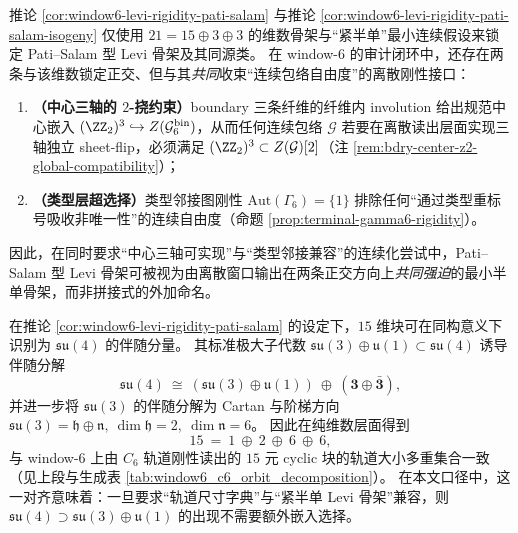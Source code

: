 \begin{remark}\label{rem:window6-levi-rigidity-center-autgamma6}
推论 \ref{cor:window6-levi-rigidity-pati-salam} 与推论 \ref{cor:window6-levi-rigidity-pati-salam-isogeny} 仅使用 \(21=15\oplus 3\oplus 3\) 的维数骨架与“紧半单”最小连续假设来锁定 Pati--Salam 型 Levi 骨架及其同源类。
在 window-\(6\) 的审计闭环中，还存在两条与该维数锁定正交、但与其\emph{共同}收束“连续包络自由度”的离散刚性接口：
\begin{enumerate}
  \item \textbf{（中心三轴的 \(2\)-挠约束）}boundary 三条纤维的纤维内 involution 给出规范中心嵌入 \((\ZZ_2)^3\hookrightarrow Z(\mathcal{G}^{\mathrm{bin}}_6)\)，从而任何连续包络 \(\mathcal{G}\) 若要在离散读出层面实现三轴独立 sheet-flip，必须满足 \((\ZZ_2)^3\subset Z(\mathcal{G})[2]\)（注 \ref{rem:bdry-center-z2-global-compatibility}）；
  \item \textbf{（类型层超选择）}类型邻接图刚性 \(\mathrm{Aut}(\Gamma_6)=\{1\}\) 排除任何“通过类型重标号吸收非唯一性”的连续自由度（命题 \ref{prop:terminal-gamma6-rigidity}）。
\end{enumerate}
因此，在同时要求“中心三轴可实现”与“类型邻接兼容”的连续化尝试中，Pati--Salam 型 Levi 骨架可被视为由离散窗口输出在两条正交方向上\emph{共同强迫}的最小半单骨架，而非拼接式的外加命名。
\end{remark}

\begin{remark}[\texorpdfstring{$15=1\oplus 2\oplus 6\oplus 6$}{15=1+2+6+6} 轨道字典与 \texorpdfstring{$\mathfrak{su}(4)\supset\mathfrak{su}(3)\oplus\mathfrak u(1)$}{su4 contains su3+u1} 的非外加对齐]\label{rem:window6-su4-su3u1-orbit-dictionary}
在推论 \ref{cor:window6-levi-rigidity-pati-salam} 的设定下，\(15\) 维块可在同构意义下识别为 \(\mathfrak{su}(4)\) 的伴随分量。
其标准极大子代数 \(\mathfrak{su}(3)\oplus\mathfrak u(1)\subset\mathfrak{su}(4)\) 诱导伴随分解
\[
\mathfrak{su}(4)\ \cong\ (\mathfrak{su}(3)\oplus\mathfrak u(1))\ \oplus\ (\mathbf3\oplus\bar{\mathbf3}),
\]
并进一步将 \(\mathfrak{su}(3)\) 的伴随分解为 Cartan 与阶梯方向
\(
\mathfrak{su}(3)=\mathfrak h\oplus\mathfrak n,\ \dim\mathfrak h=2,\ \dim\mathfrak n=6
\)。
因此在纯维数层面得到
\[
15\ =\ 1\ \oplus\ 2\ \oplus\ 6\ \oplus\ 6,
\]
与 window-\(6\) 上由 \(C_6\) 轨道刚性读出的 \(15\) 元 cyclic 块的轨道大小多重集合一致（见上段与生成表 \ref{tab:window6_c6_orbit_decomposition}）。
在本文口径中，这一对齐意味着：一旦要求“轨道尺寸字典”与“紧半单 Levi 骨架”兼容，则 \(\mathfrak{su}(4)\supset\mathfrak{su}(3)\oplus\mathfrak u(1)\) 的出现不需要额外嵌入选择。
\end{remark}

